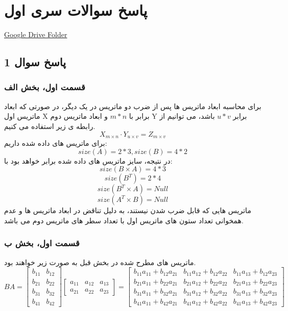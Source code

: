 
\chapter{پاسخ سوالات سری اول}

\href{https://drive.google.com/drive/folders/1BMXUcHZQBMV6n8P9XX5LD0nV40Ff3FDP?usp=drive_link}{Google Drive Folder}

\section{ پاسخ سوال 1}
\subsection{قسمت اول، بخش الف}
برای محاسبه ابعاد ماتریس ها پس از ضرب دو ماتریس در یک دیگر، در صورتی که ابعاد ماتریس اول X برابر با $m * n$ و ابعاد ماتریس دوم Y برابر $u * v$ باشد، می توانیم از رابطه ی زیر استفاده می کنیم. 
\[
X_{m \times n} \cdot Y_{u \times v} = Z_{m \times v}
\]
برای ماتریس های داده شده داریم:
\[
size(A) = 2*3 , size(B) = 4*2
\]
در نتیجه، سایز ماتریس های داده شده برابر خواهد بود با:
\[
size(B \times A) = 4*3 
\]
\[
size(B^{T}) = 2*4 
\]
\[
size(B^{T} \times A) = Null 
\]
\[
size(A^{T} \times B) = Null 
\]
ماتریس هایی که قابل ضرب شدن نیستند، به دلیل تناقض در ابعاد ماتریس ها و عدم همخوانی تعداد ستون های ماتریس اول با تعداد سطر های ماتریس دوم می باشد.

\subsection{قسمت اول، بخش ب}
ماتریس های مطرح شده در بخش قبل به صورت زیر خواهند بود.
\[
BA =
\begin{bmatrix}
	b_{11} & b_{12} \\
	b_{21} & b_{22} \\
	b_{31} & b_{32} \\
	b_{41} & b_{42}
\end{bmatrix}
\begin{bmatrix}
	a_{11} & a_{12} & a_{13} \\
	a_{21} & a_{22} & a_{23}
\end{bmatrix}
=
\begin{bmatrix}
	b_{11} a_{11} + b_{12} a_{21} & b_{11} a_{12} + b_{12} a_{22} & b_{11} a_{13} + b_{12} a_{23} \\
	b_{21} a_{11} + b_{22} a_{21} & b_{21} a_{12} + b_{22} a_{22} & b_{21} a_{13} + b_{22} a_{23} \\
	b_{31} a_{11} + b_{32} a_{21} & b_{31} a_{12} + b_{32} a_{22} & b_{31} a_{13} + b_{32} a_{23} \\
	b_{41} a_{11} + b_{42} a_{21} & b_{41} a_{12} + b_{42} a_{22} & b_{41} a_{13} + b_{42} a_{23}
\end{bmatrix}
\]

